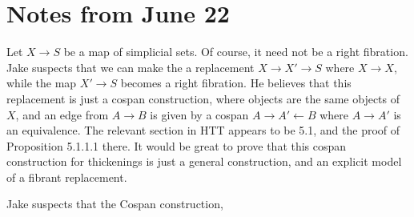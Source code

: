

\section{Notes from June 22}

Let $X \to S$ be a map of simplicial sets. Of course, it need not be a right fibration. Jake suspects that we can make the a replacement $X \to X' \to S$ where $X \to X$, while the map $X' \to S$ becomes a right fibration. He believes that this replacement is just a cospan construction, where objects are the same objects of $X$, and an edge from $A \to B$ is given by a cospan $A \to A' \leftarrow B$ where $A \to A'$ is an equivalence. The relevant section in HTT appears to be 5.1, and the proof of Proposition 5.1.1.1 there. It would be great to prove that this cospan construction for thickenings is just a general construction, and an explicit model of a fibrant replacement.

Jake suspects that the Cospan construction,
